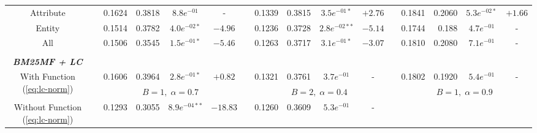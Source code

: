 \begin{table*}
{\begin{tabular}{cc@{\hs}rrccc@{\hs}rrccc@{\hs}rrcc}
{\raggedright Attribute} & \phantom{a} & 0.1624 & 0.3818 & $8.8e^{-01}$ & -
                         & \phantom{a} & 0.1339 & 0.3815 & $3.5e^{-01*}$ & $+2.76$
                         & \phantom{a} & 0.1841 & 0.2060 & $5.3e^{-02*}$ & $+1.66$ \\
{\raggedright Entity} & \phantom{a} & 0.1514 & 0.3782 & $4.0e^{-02*}$ & $-4.96$
                      & \phantom{a} & 0.1236 & 0.3728 & $2.8e^{-02**}$ & $-5.14$
                      & \phantom{a} & 0.1744 & 0.188 & $4.7e^{-01}$ & - \\
{\raggedright All} & \phantom{a} & 0.1506 & 0.3545 & $1.5e^{-01*}$ & $-5.46$
                   & \phantom{a} & 0.1263 & 0.3717 & $3.1e^{-01*}$ & $-3.07$
                   & \phantom{a} & 0.1810 & 0.2080 & $7.1e^{-01}$ & - \\
\\
\emph{\textbf{BM25MF + LC}} & \multicolumn{15}{c}{\phantom{a}} \\
\multirow{2}{*}{{\raggedright With Function (\ref{eq:lc-norm})}} & \phantom{a} & 0.1606 & 0.3964 & $2.8e^{-01*}$ & $+0.82$
                                                                 & \phantom{a} & 0.1321 & 0.3761 & $3.7e^{-01}$ & -
                                                                 & \phantom{a} & 0.1802 & 0.1920 & $5.4e^{-01}$ & - \\
 & \phantom{a} & \multicolumn{4}{c}{$B=1,\;\alpha=0.7$}
   & \phantom{a} & \multicolumn{4}{c}{$B=2,\;\alpha=0.4$}
   & \phantom{a} & \multicolumn{4}{c}{$B=1,\;\alpha=0.9$} \\
{\raggedright Without Function (\ref{eq:lc-norm})} & \phantom{a} & 0.1293 & 0.3055 & $8.9e^{-04**}$ & $-18.83$
                                                   & \phantom{a} & 0.1260 & 0.3609 & $5.3e^{-01}$ & -

\end{tabular}}
\end{table*}
